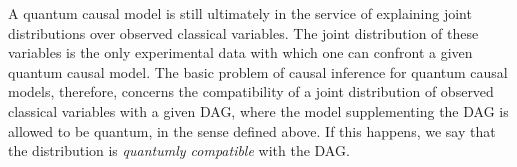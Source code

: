 \documentclass[aps,english,10pt,superscriptaddress,onecolumn,twoside,longbibliography,pra,floatfix,fleqn,nofootinbib]{revtex4-1}%
\theoremstyle{definition}
\begin{document}




A quantum causal model is still ultimately in the service of explaining joint distributions over observed classical variables. The joint distribution of these variables is the only experimental data with which one can confront a given quantum causal model. The basic problem of causal inference for quantum causal models, therefore, concerns the compatibility of a joint distribution of observed classical variables with a given DAG, where the model supplementing the DAG is allowed to be quantum, in the sense defined above. If this happens, we say that the distribution is {\em quantumly compatible} with the DAG.  
 
\end{document}
